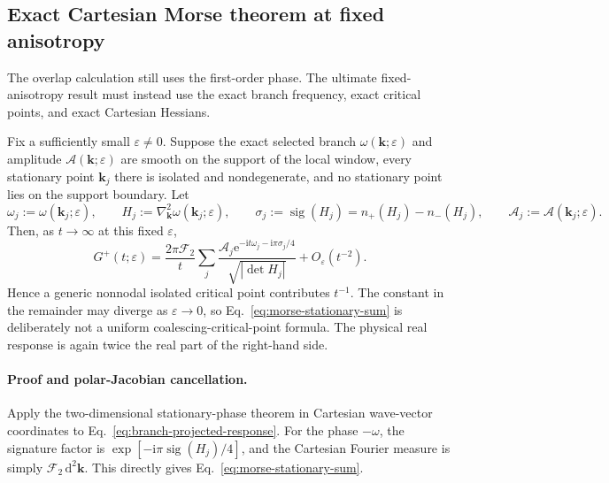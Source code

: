 \subsection{Exact Cartesian Morse theorem at fixed anisotropy}

The overlap calculation still uses the first-order phase.  The ultimate
fixed-anisotropy result must instead use the exact branch frequency, exact
critical points, and exact Cartesian Hessians.

\begin{theorem}
\label{thm:fixed-anisotropy-decay}
Fix a sufficiently small \(\varepsilon\ne0\).  Suppose the exact selected
branch \(\omega(\mathbf k;\varepsilon)\) and amplitude
\(\mathcal A(\mathbf k;\varepsilon)\) are smooth on the support of the
local window, every stationary point \(\mathbf k_j\) there is isolated and
nondegenerate, and no stationary point lies on the support boundary.  Let
\begin{equation}
  \omega_j:=\omega(\mathbf k_j;\varepsilon),
  \qquad
  H_j:=\nabla_{\mathbf k}^2\omega(\mathbf k_j;\varepsilon),
  \qquad
  \sigma_j:=\operatorname{sig}(H_j)=n_+(H_j)-n_-(H_j),
  \qquad
  \mathcal A_j:=\mathcal A(\mathbf k_j;\varepsilon).
  \label{eq:exact-morse-data}
\end{equation}
Then, as \(t\to\infty\) at this fixed \(\varepsilon\),
\begin{equation}
  G^{+}(t;\varepsilon)
  =\frac{2\pi\mathscr F_2}{t}
    \sum_j
    \frac{\mathcal A_j
      \mathrm e^{-\mathrm it\omega_j-\mathrm i\pi\sigma_j/4}}
         {\sqrt{|\det H_j|}}
    +O_\varepsilon(t^{-2}).
  \label{eq:morse-stationary-sum}
\end{equation}
Hence a generic nonnodal isolated critical point contributes \(t^{-1}\).
The constant in the remainder may diverge as \(\varepsilon\to0\), so
Eq.~\eqref{eq:morse-stationary-sum} is deliberately not a uniform
coalescing-critical-point formula.  The physical real response is again
twice the real part of the right-hand side.
\end{theorem}

\paragraph{Proof and polar-Jacobian cancellation.}
Apply the two-dimensional stationary-phase theorem in Cartesian
wave-vector coordinates to Eq.~\eqref{eq:branch-projected-response}.
For the phase \(-\omega\), the signature factor is
\(\exp[-\mathrm i\pi\operatorname{sig}(H_j)/4]\), and the Cartesian Fourier
measure is simply \(\mathscr F_2\,\mathrm d^2\mathbf k\).  This directly
gives Eq.~\eqref{eq:morse-stationary-sum}.

